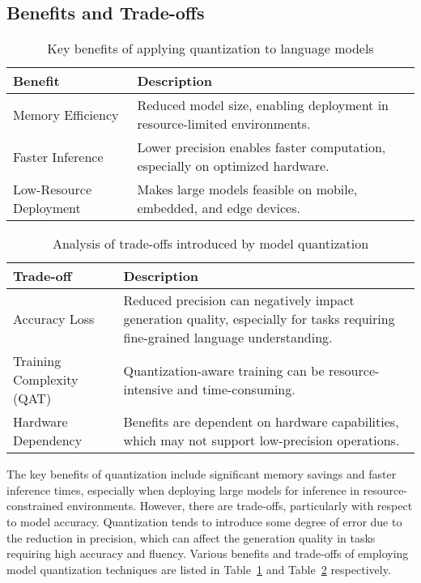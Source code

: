 \subsection{Benefits and Trade-offs}

\begin{table}[t]
  \centering
  \scriptsize
  \renewcommand{\arraystretch}{1.3}
  \begin{tabularx}{0.95\textwidth}{
    >{\raggedright\arraybackslash}p{5cm}
    >{\raggedright\arraybackslash}X
  }
    \toprule
    \textbf{Benefit} & \textbf{Description} \\
    \midrule
    Memory Efficiency & Reduced model size, enabling deployment in resource-limited environments. \\
    Faster Inference & Lower precision enables faster computation, especially on optimized hardware. \\
    Low-Resource Deployment & Makes large models feasible on mobile, embedded, and edge devices. \\
    \bottomrule
  \end{tabularx}
  \caption{Key benefits of applying quantization to language models}
  \label{table:benefits-quant}
\end{table}

\begin{table}[t]
  \centering
  \scriptsize
  \renewcommand{\arraystretch}{1.3}
  \begin{tabularx}{0.95\textwidth}{
    >{\raggedright\arraybackslash}p{5cm}
    >{\raggedright\arraybackslash}X
  }
    \toprule
    \textbf{Trade-off} & \textbf{Description} \\
    \midrule
    Accuracy Loss & Reduced precision can negatively impact generation quality, especially for tasks requiring fine-grained language understanding. \\
    Training Complexity (QAT) & Quantization-aware training can be resource-intensive and time-consuming. \\
    Hardware Dependency & Benefits are dependent on hardware capabilities, which may not support low-precision operations. \\
    \bottomrule
  \end{tabularx}
  \caption{Analysis of trade-offs introduced by model quantization}
  \label{table:trade-offs-quant}
\end{table}

The key benefits of quantization include significant memory savings and faster inference
times, especially when deploying large models for inference in resource-constrained environments.
However, there are trade-offs, particularly with respect to model accuracy.
Quantization tends to introduce some degree of error due to the reduction in precision,
which can affect the generation quality in tasks requiring high accuracy and fluency.
Various benefits and trade-offs of employing model quantization techniques
are listed in Table~\ref{table:benefits-quant} and Table~\ref{table:trade-offs-quant} respectively.

